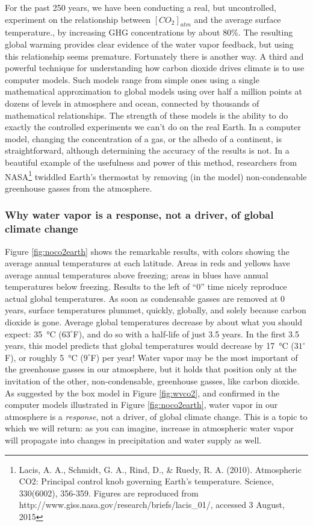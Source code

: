 For the past 250 years, we have been conducting a real, but uncontrolled, experiment on the relationship between $[CO_2]_{atm}$ and the average surface temperature., by increasing GHG concentrations by about 80\%. The resulting global warming provides clear evidence of the water vapor feedback, but using this relationship seems premature. Fortunately there is another way. A third and powerful technique for understanding how carbon dioxide drives climate is to use computer models. Such models range from simple ones using a single mathematical approximation to global models using over half a million points at dozens of levels in atmosphere and ocean, connected by thousands of mathematical relationships. The strength of these models is the ability to do exactly the controlled experiments we can't do on the real Earth. In a computer model, changing the concentration of a gas, or the albedo of a continent, is straightforward, although determining the accuracy of the results is not. In a beautiful example of the usefulness and power of this method, researchers from NASA\footnote{Lacis, A. A., Schmidt, G. A., Rind, D., \& Ruedy, R. A. (2010). Atmospheric CO2: Principal control knob governing Earth's temperature. Science, 330(6002), 356-359. Figures are reproduced from http://www.giss.nasa.gov/research/briefs/lacis\_01/, accessed 3 August, 2015} twiddled Earth's thermostat by removing (in the model) non-condensable greenhouse gasses from the atmosphere. 

\subsubsection{Why water vapor is a response, not a driver, of global climate change}
Figure \ref{fig:noco2earth} shows the remarkable results, with colors showing the average annual temperatures at each latitude. Areas in reds and yellows have average annual temperatures above freezing; areas in blues have annual temperatures below freezing. Results to the left of ``0'' time nicely reproduce actual global temperatures.  As soon as condensable gasses are removed at 0 years, surface temperatures plummet, quickly, globally, and solely because carbon dioxide is gone. Average global temperatures decrease by about what you should expect: \SI{35}{\celsius} ($63^{\circ}$F), and do so with a half-life of just 3.5 years. In the first 3.5 years, this model predicts that global temperatures would decrease by \SI{17}{\celsius} ($31^{\circ}$F), or roughly \SI{5}{\celsius} ($9^{\circ}$F) per year! Water vapor may be the most important of the greenhouse gasses in our atmosphere, but it holds that position only at the invitation of the other, non-condensable, greenhouse gasses, like carbon dioxide. As suggested by the box model in Figure \ref{fig:wvco2}, and confirmed in the computer models illustrated in Figure \ref{fig:noco2earth}, water vapor in our atmosphere is a \emph{response}, not a driver, of global climate change. This is a topic to which we will return: as you can imagine, increase in atmospheric water vapor will propagate into changes in precipitation and water supply as well. 

